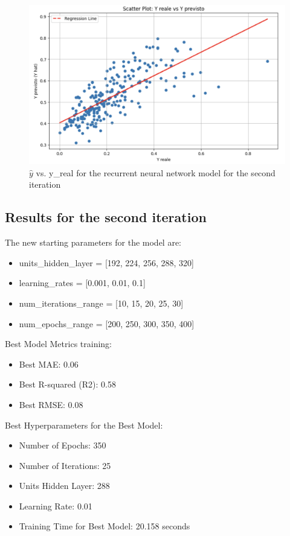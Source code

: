 \documentclass[10pt]{article} %
\begin{document}
    \begin{figure}
        \centering
        \includegraphics[scale = 0.4]{Assets/iteration 1/lstm_it1_2.png}
        \caption{$\hat{y}$ vs. y\_real for the recurrent neural network model for the second iteration}
        \label{fig:enter-label}
    \end{figure}
    \newpage

    \subsection{Results for the second iteration}
      The new starting parameters for the model are:
    \begin{itemize}
        \item  units\_hidden\_layer = [192, 224, 256, 288, 320]
        \item learning\_rates =  [0.001, 0.01, 0.1]
        \item num\_iterations\_range = [10, 15, 20, 25, 30]
        \item num\_epochs\_range = [200, 250, 300, 350, 400]
    \end{itemize}
    
    Best Model Metrics training:
    \begin{itemize}
        \item Best MAE: 0.06
        \item Best R-squared (R2): 0.58
        \item Best RMSE: 0.08
    \end{itemize}
    Best Hyperparameters for the Best Model:
    \begin{itemize}
        \item Number of Epochs: 350
        \item Number of Iterations: 25
        \item Units Hidden Layer: 288
        \item Learning Rate: 0.01
        \item Training Time for Best Model: 20.158 seconds
    \end{itemize}
\end{document}
